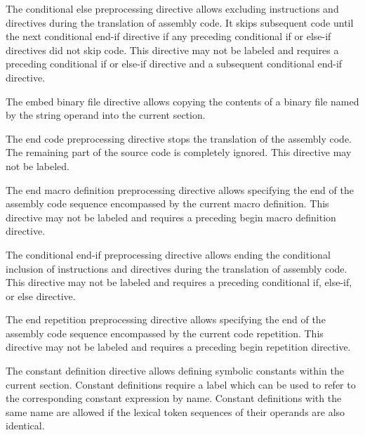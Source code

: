 
The conditional else preprocessing directive allows excluding instructions and directives during the translation of assembly code.
It skips subsequent code until the next conditional end-if directive if any preceding conditional if or else-if directives did not skip code.
This directive may not be labeled and requires a preceding conditional if or else-if directive and a subsequent conditional end-if directive.


The embed binary file directive allows copying the contents of a binary file named by the string operand into the current section.


The end code preprocessing directive stops the translation of the assembly code.
The remaining part of the source code is completely ignored.
This directive may not be labeled.


The end macro definition preprocessing directive allows specifying the end of the assembly code sequence encompassed by the current macro definition.
This directive may not be labeled and requires a preceding begin macro definition directive.


The conditional end-if preprocessing directive allows ending the conditional inclusion of instructions and directives during the translation of assembly code.
This directive may not be labeled and requires a preceding conditional if, else-if, or else directive.


The end repetition preprocessing directive allows specifying the end of the assembly code sequence encompassed by the current code repetition.
This directive may not be labeled and requires a preceding begin repetition directive.


The constant definition directive allows defining symbolic constants within the current section.
Constant definitions require a label which can be used to refer to the corresponding constant expression by name.
Constant definitions with the same name are allowed if the lexical token sequences of their operands are also identical.

